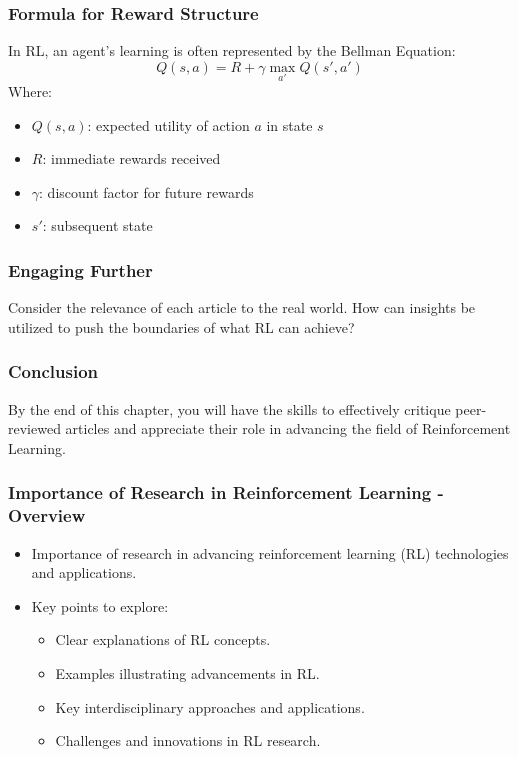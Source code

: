 \documentclass[aspectratio=169]{beamer}
\begin{document}
\begin{frame}[fragile]
    \frametitle{Formula for Reward Structure}
    In RL, an agent's learning is often represented by the Bellman Equation:
    \begin{equation}
    Q(s, a) = R + \gamma \max_{a'} Q(s', a')
    \end{equation}
    Where:
    \begin{itemize}
        \item \( Q(s, a) \): expected utility of action \( a \) in state \( s \)
        \item \( R \): immediate rewards received
        \item \( \gamma \): discount factor for future rewards
        \item \( s' \): subsequent state
    \end{itemize}
\end{frame}

\begin{frame}[fragile]
    \frametitle{Engaging Further}
    Consider the relevance of each article to the real world. How can insights be utilized to push the boundaries of what RL can achieve?
\end{frame}

\begin{frame}[fragile]
    \frametitle{Conclusion}
    By the end of this chapter, you will have the skills to effectively critique peer-reviewed articles and appreciate their role in advancing the field of Reinforcement Learning.
\end{frame}

\begin{frame}[fragile]
    \frametitle{Importance of Research in Reinforcement Learning - Overview}
    \begin{itemize}
        \item Importance of research in advancing reinforcement learning (RL) technologies and applications.
        \item Key points to explore:
        \begin{itemize}
            \item Clear explanations of RL concepts.
            \item Examples illustrating advancements in RL.
            \item Key interdisciplinary approaches and applications.
            \item Challenges and innovations in RL research.
        \end{itemize}
    \end{itemize}
\end{frame}
\end{document}
